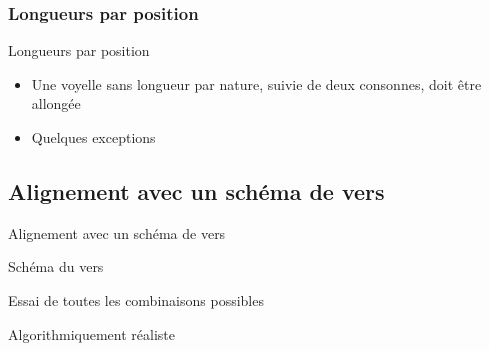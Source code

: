 \documentclass{beamer}
\newcommand{\syll}[1]{\fbox{#1 \hspace{5mm}}}
\begin{document}
\subsubsection{Longueurs par position}

\begin{frame}{Longueurs par position}

\begin{itemize}
\item Une voyelle sans longueur par nature, suivie de deux consonnes, doit être allongée
\item Quelques exceptions
\end{itemize}
\end{frame} %


\subsection{Alignement avec un schéma de vers}

\begin{frame}{Alignement avec un schéma de vers}


Schéma du vers

Essai de toutes les combinaisons possibles

Algorithmiquement réaliste

\end{frame} %
\end{document}
